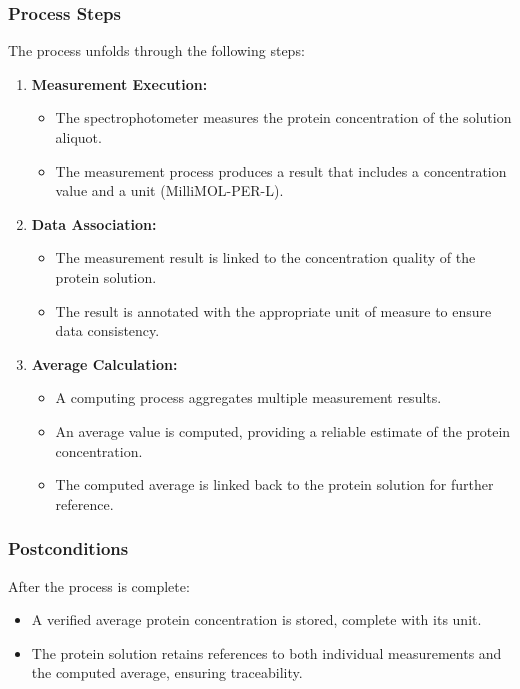 \subsubsection{Process Steps}
The process unfolds through the following steps:
\begin{enumerate}[noitemsep]
    \item \textbf{Measurement Execution:}
    \begin{itemize}[noitemsep]
        \item The spectrophotometer measures the protein concentration of the solution aliquot.
        \item The measurement process produces a result that includes a concentration value and a unit (MilliMOL-PER-L).
    \end{itemize}
    \item \textbf{Data Association:}
    \begin{itemize}[noitemsep]
        \item The measurement result is linked to the concentration quality of the protein solution.
        \item The result is annotated with the appropriate unit of measure to ensure data consistency.
    \end{itemize}
    \item \textbf{Average Calculation:}
    \begin{itemize}[noitemsep]
        \item A computing process aggregates multiple measurement results.
        \item An average value is computed, providing a reliable estimate of the protein concentration.
        \item The computed average is linked back to the protein solution for further reference.
    \end{itemize}
\end{enumerate}

\subsubsection{Postconditions}
After the process is complete:
\begin{itemize}[noitemsep]
    \item A verified average protein concentration is stored, complete with its unit.
    \item The protein solution retains references to both individual measurements and the computed average, ensuring traceability.
\end{itemize}

